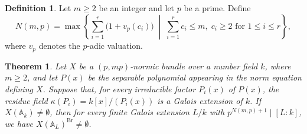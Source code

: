 \documentclass[10pt]{amsart}
\theoremstyle{plain}
\newtheorem{theorem}[thm]{Theorem}
\theoremstyle{definition}
\newtheorem{definition}[thm]{Definition}
\newcommand{\A}{{\mathbb A}}
\newcommand{\Br}{\operatorname{Br}}
\begin{document}
\begin{definition}\label{def:combinatorial-exponent}
Let $m\ge 2$ be an integer and let $p$ be a prime. Define
$$
N(m,p)=
\max\left\{
\sum_{i=1}^r\bigl(1+v_p(c_i)\bigr)
\;\middle|\;
\sum_{i=1}^r c_i\le m,\;
c_i\ge 2
\text{ for }1\le i\le r
\right\},
$$
where $v_p$ denotes the $p$-adic valuation.
\end{definition}



\begin{theorem}\label{generalized-p-mp}
    Let $X$ be a $(p, mp)$-normic bundle over a number field $k$, where $m \geq 2$, and let $P(x)$ be the separable polynomial appearing in the norm equation defining $X$. Suppose that, for every irreducible factor \(P_i(x)\) of \(P(x)\), the residue field
    \(\kappa(P_i)=k[x]/(P_i(x))\) is a Galois extension of \(k\). If $X(\A_k) \neq \emptyset$, then for every finite Galois extension $L/k$ with $p^{N(m,p) + 1} \mid [L:k]$, we have \(X(\A_L)^{\Br} \neq \emptyset\).
\end{theorem}
\end{document}
